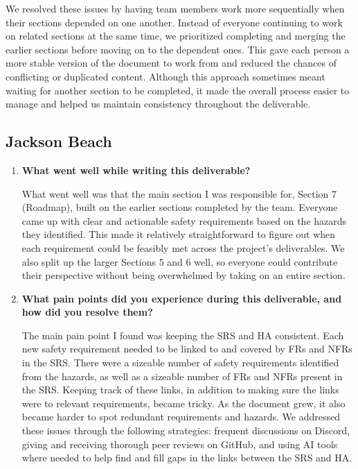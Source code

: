 \documentclass{article}
\newcounter{hazard}
\begin{document}
\begin{enumerate}
    We resolved these issues by having team members work more
    sequentially when their sections depended on one another.
    Instead of everyone continuing to work on related sections
    at the same time, we prioritized completing and merging the
    earlier sections before moving on to the dependent ones.
    This gave each person a more stable version of the document
    to work from and reduced the chances of conflicting or
    duplicated content. Although this approach
    sometimes meant waiting for another section to be completed,
    it made the overall process easier to manage and helped us
    maintain consistency throughout the deliverable.
    
\end{enumerate}

\subsection*{Jackson Beach}

\begin{enumerate}
    \item \textbf{What went well while writing this deliverable?}

    What went well was that the main section I was responsible for, Section 7 (Roadmap), built on the
    earlier sections completed by the team. Everyone came up with clear and
    actionable safety requirements based on the hazards they identified. This
    made it relatively straightforward to figure out when each requirement could
    be feasibly met across the project's deliverables. We also split up the
    larger Sections 5 and 6 well, so everyone could contribute their perspective
    without being overwhelmed by taking on an entire section.

    \item \textbf{What pain points did you experience during this deliverable,
    and how did you resolve them?}

    The main pain point I found was keeping the SRS and HA consistent. Each new safety
    requirement needed to be linked to and covered by FRs and NFRs in the SRS.
    There were a sizeable number of safety requirements identified from the hazards, as well as a
    sizeable number of FRs and NFRs present in the SRS. Keeping track of these links, in addition to
    making sure the links were to relevant requirements, became tricky. As the document grew,
    it also became harder to spot redundant requirements and hazards. We addressed these issues through the following strategies:
    frequent discussions on Discord, giving and receiving thorough peer reviews
    on GitHub, and using AI tools where needed to help find and fill gaps in the
    links between the SRS and HA.

\end{enumerate}
\end{document}
